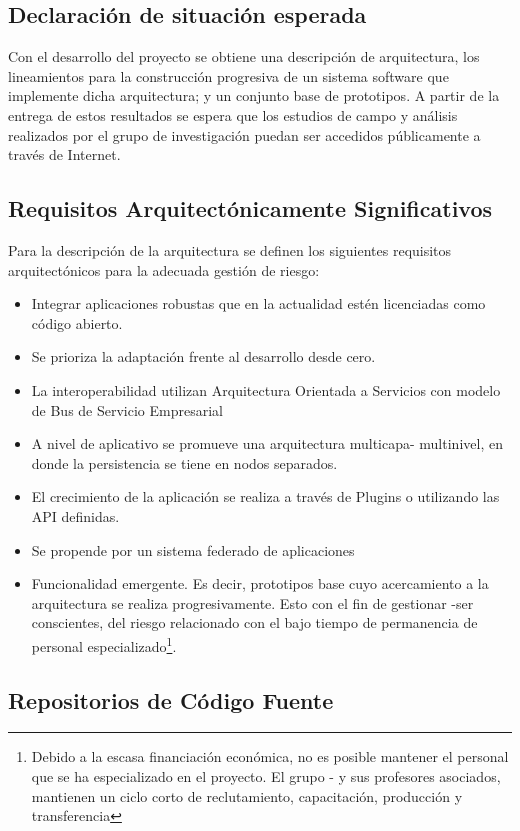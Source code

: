 \subsection{Declaración de situación esperada}

Con el desarrollo del proyecto se obtiene una descripción de arquitectura, los lineamientos para la construcción progresiva de un sistema software que implemente dicha arquitectura; y un conjunto base de prototipos. A partir de la entrega de estos resultados se espera que los estudios de campo y análisis realizados por el grupo de investigación puedan ser accedidos públicamente a través de Internet.

\subsection{Requisitos Arquitectónicamente Significativos}
Para la descripción de la arquitectura se definen los siguientes requisitos arquitectónicos para la adecuada gestión de riesgo:
\begin{itemize}
 \item Integrar aplicaciones robustas que en la actualidad estén licenciadas como código abierto.
 \item Se prioriza la adaptación frente al desarrollo desde cero.
 \item La interoperabilidad utilizan Arquitectura Orientada a Servicios con modelo de Bus de Servicio Empresarial
 \item A nivel de aplicativo se promueve una arquitectura multicapa- multinivel, en donde la persistencia se tiene en nodos separados.
 \item El crecimiento de la aplicación se realiza a través de Plugins o utilizando las API definidas.
 \item Se propende por un sistema federado de aplicaciones
 \item Funcionalidad emergente. Es decir, prototipos base cuyo acercamiento a la arquitectura se realiza progresivamente. Esto con el fin de gestionar -ser conscientes, del riesgo relacionado con el bajo tiempo de permanencia de personal especializado\footnote{Debido a la escasa financiación económica, no es posible mantener el personal que se ha especializado en el proyecto. El grupo - y sus profesores asociados, mantienen un ciclo corto de reclutamiento, capacitación, producción y transferencia}.
\end{itemize}

\subsection{Repositorios de Código Fuente}

